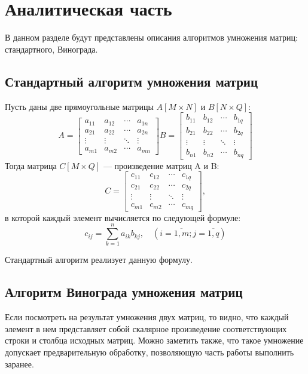 \chapter{Аналитическая часть}
В данном разделе будут представлены описания алгоритмов умножения матриц: стандартного, Винограда.

\section{Стандартный алгоритм умножения матриц}

Пусть даны две прямоугольные матрицы $A[M \times N]$ и $B[N \times Q]$:
$$
A = 
\begin{bmatrix} 
	a_{11} & a_{12} & \cdots & a_{1n} \\
	a_{21} & a_{22} & \cdots & a_{2n} \\ 
	\vdots & \vdots & \ddots & \vdots \\ 
	a_{m1} & a_{m2} & \cdots & a_{mn}
\end{bmatrix}
B =   
\begin{bmatrix} 
	b_{11} & b_{12} & \cdots & b_{1q} \\
	b_{21} & b_{22} & \cdots & b_{2q} \\ 
	\vdots & \vdots & \ddots & \vdots \\ 
	b_{n1} & b_{n2} & \cdots & b_{nq}
\end{bmatrix}
$$
Тогда матрица $C[M \times Q]$ --- произведение матриц A и B:
$$
C = 
\begin{bmatrix} 
	c_{11} & c_{12} & \cdots & c_{1q} \\
	c_{21} & c_{22} & \cdots & c_{2q} \\ 
	\vdots & \vdots & \ddots & \vdots \\ 
	c_{m1} & c_{m2} & \cdots & c_{mq}
\end{bmatrix},
$$
в которой каждый элемент вычисляется по следующей формуле: 
\begin{equation}
	\label{eq:N}
	c_{ij} =
	\sum_{k=1}^{n} a_{ik}b_{kj}, \quad (i=\overline{1,m}; j=\overline{1,q})
\end{equation}

Стандартный алгоритм реализует данную формулу.


\section{Алгоритм Винограда умножения матриц}
Если посмотреть на результат умножения двух матриц, то видно, что каждый элемент в нем представляет собой скалярное произведение соответствующих строки и столбца исходных матриц.
Можно заметить также, что такое умножение допускает предварительную обработку, позволяющую часть работы выполнить заранее.

